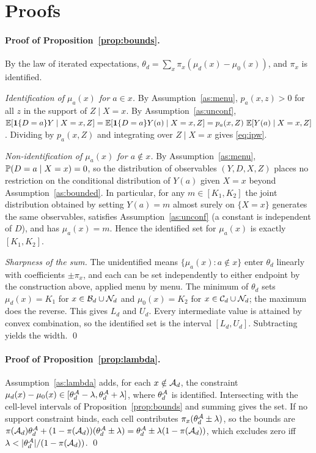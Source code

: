 \section{Proofs}\label{app:proofs}

\paragraph{Proof of Proposition~\ref{prop:bounds}.}
By the law of iterated expectations, $\theta_d=\sum_x\pi_x(\mu_d(x)-\mu_0(x))$, and $\pi_x$ is identified.

\emph{Identification of $\mu_a(x)$ for $a\in x$.} By Assumption~\ref{as:menu}, $p_a(x,z)>0$ for all $z$ in the
support of $Z\mid X=x$. By Assumption~\ref{as:unconf},
$\operatorname{\mathbb{E}}[\mathbf{1}\{D=a\}Y\mid X=x,Z]=\operatorname{\mathbb{E}}[\mathbf{1}\{D=a\}Y(a)\mid X=x,Z]=p_a(x,Z)\,\operatorname{\mathbb{E}}[Y(a)\mid X=x,Z]$. Dividing by $p_a(x,Z)$ and
integrating over $Z\mid X=x$ gives \eqref{eq:ipw}.

\emph{Non-identification of $\mu_a(x)$ for $a\notin x$.} By Assumption~\ref{as:menu}, $\mathbb{P}(D=a\mid X=x)=0$, so
the distribution of observables $(Y,D,X,Z)$ places no restriction on the conditional distribution of $Y(a)$ given
$X=x$ beyond Assumption~\ref{as:bounded}. In particular, for any $m\in[K_1,K_2]$ the joint distribution
obtained by setting $Y(a)=m$ almost surely on $\{X=x\}$ generates the same observables, satisfies
Assumption~\ref{as:unconf} (a constant is independent of $D$), and has $\mu_a(x)=m$. Hence the identified set for
$\mu_a(x)$ is exactly $[K_1,K_2]$.

\emph{Sharpness of the sum.} The unidentified means $\{\mu_a(x): a\notin x\}$ enter $\theta_d$ linearly with
coefficients $\pm\pi_x$, and each can be set independently to either endpoint by the construction above, applied
menu by menu. The minimum of $\theta_d$ sets $\mu_d(x)=K_1$ for $x\in\mathcal{B}_d\cup\mathcal{N}_d$ and $\mu_0(x)=K_2$ for
$x\in\mathcal{C}_d\cup\mathcal{N}_d$; the maximum does the reverse. This gives $L_d$ and $U_d$. Every intermediate value is attained
by convex combination, so the identified set is the interval $[L_d,U_d]$. Subtracting yields the width. \qed

\paragraph{Proof of Proposition~\ref{prop:lambda}.}
Assumption~\ref{as:lambda} adds, for each $x\notin\mathcal{A}_d$, the constraint
$\mu_d(x)-\mu_0(x)\in[\theta^{\mathcal{A}}_d-\lambda,\theta^{\mathcal{A}}_d+\lambda]$, where $\theta^{\mathcal{A}}_d$ is identified. Intersecting with
the cell-level intervals of Proposition~\ref{prop:bounds} and summing gives the set. If no support constraint
binds, each cell contributes $\pi_x(\theta^{\mathcal{A}}_d\pm\lambda)$, so the bounds are
$\pi(\mathcal{A}_d)\theta^{\mathcal{A}}_d+(1-\pi(\mathcal{A}_d))(\theta^{\mathcal{A}}_d\pm\lambda)=\theta^{\mathcal{A}}_d\pm\lambda(1-\pi(\mathcal{A}_d))$, which excludes zero iff
$\lambda<|\theta^{\cA}_d|/(1-\pi(\cA_d))$. \qed

